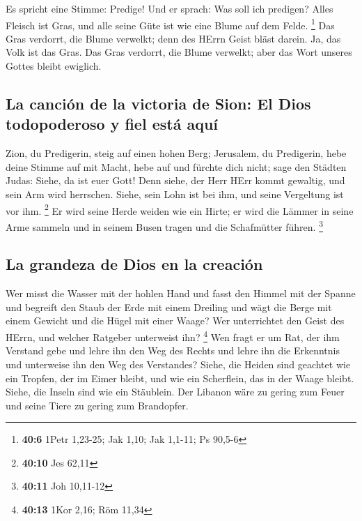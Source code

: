  Es spricht eine Stimme: Predige! Und er sprach: Was soll
ich predigen? Alles Fleisch ist Gras, und alle seine Güte ist wie eine
Blume auf dem Felde. \footnote{\textbf{40:6} 1Petr 1,23-25; Jak 1,10;
  Jak 1,1-11; Ps 90,5-6}  Das Gras verdorrt, die Blume
verwelkt; denn des HErrn Geist bläst darein. Ja, das Volk ist das Gras.
 Das Gras verdorrt, die Blume verwelkt; aber das Wort
unseres Gottes bleibt ewiglich.

\hypertarget{la-canciuxf3n-de-la-victoria-de-sion-el-dios-todopoderoso-y-fiel-estuxe1-aquuxed}{%
\subsection{La canción de la victoria de Sion: El Dios todopoderoso y
fiel está
aquí}\label{la-canciuxf3n-de-la-victoria-de-sion-el-dios-todopoderoso-y-fiel-estuxe1-aquuxed}}

 Zion, du Predigerin, steig auf einen hohen Berg;
Jerusalem, du Predigerin, hebe deine Stimme auf mit Macht, hebe auf und
fürchte dich nicht; sage den Städten Judas: Siehe, da ist euer Gott!
 Denn siehe, der Herr HErr kommt gewaltig, und sein Arm
wird herrschen. Siehe, sein Lohn ist bei ihm, und seine Vergeltung ist
vor ihm. \footnote{\textbf{40:10} Jes 62,11}  Er wird
seine Herde weiden wie ein Hirte; er wird die Lämmer in seine Arme
sammeln und in seinem Busen tragen und die Schafmütter führen.
\footnote{\textbf{40:11} Joh 10,11-12}

\hypertarget{la-grandeza-de-dios-en-la-creaciuxf3n}{%
\subsection{La grandeza de Dios en la
creación}\label{la-grandeza-de-dios-en-la-creaciuxf3n}}

 Wer misst die Wasser mit der hohlen Hand und fasst den
Himmel mit der Spanne und begreift den Staub der Erde mit einem Dreiling
und wägt die Berge mit einem Gewicht und die Hügel mit einer Waage?
 Wer unterrichtet den Geist des HErrn, und welcher
Ratgeber unterweist ihn? \footnote{\textbf{40:13} 1Kor 2,16; Röm 11,34}
 Wen fragt er um Rat, der ihm Verstand gebe und lehre ihn
den Weg des Rechts und lehre ihn die Erkenntnis und unterweise ihn den
Weg des Verstandes?  Siehe, die Heiden sind geachtet wie
ein Tropfen, der im Eimer bleibt, und wie ein Scherflein, das in der
Waage bleibt. Siehe, die Inseln sind wie ein Stäublein. 
Der Libanon wäre zu gering zum Feuer und seine Tiere zu gering zum
Brandopfer.

